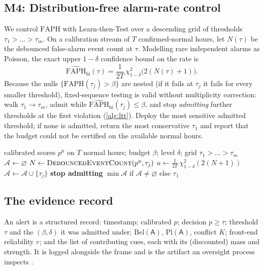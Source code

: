 \documentclass[conference]{IEEEtran}
\newcommand{\Rel}{r}                 %
\newcommand{\bel}{\mathrm{Bel}}
\newcommand{\pl}{\mathrm{Pl}}
\newcommand{\Anom}{\textsf{A}}       %
\newcommand{\faph}{\mathrm{FAPH}}
\begin{document}
\subsection{M4: Distribution-free alarm-rate control}
\label{sec:m4}
We control $\faph$ with Learn-then-Test \cite{angelopoulos2021ltt} over a
descending grid of thresholds $\tau_1>\dots>\tau_m$. On a calibration stream
of $T$ confirmed-normal hours, let $N(\tau)$ be the debounced false-alarm
event count at $\tau$. Modelling rare independent alarms as Poisson, the exact
upper $1-\delta$ confidence bound on the rate is
\begin{equation}
\widehat{\faph}_{\text{hi}}(\tau)=\frac{1}{2T}\,\chi^2_{1-\delta}\!\bigl(2(N(\tau)+1)\bigr).
\end{equation}
Because the nulls $\{\faph(\tau_j)>\beta\}$ are nested (if it fails at $\tau_j$
it fails for every smaller threshold), fixed-sequence testing is valid without
multiplicity correction: walk $\tau_1\!\to\!\tau_m$, admit while
$\widehat{\faph}_{\text{hi}}(\tau_j)\le\beta$, and stop \emph{admitting}
further thresholds at the first violation (\cref{alg:ltt}). Deploy the most sensitive admitted threshold; if none is
admitted, return the most conservative $\tau_1$ and report that the budget
could not be certified on the available normal hours.

\begin{algorithm}[t]
\caption{M4 --- alarm-rate control (Learn-then-Test)}
\label{alg:ltt}
\begin{algorithmic}[1]
\Require calibrated scores $p^{\text{n}}$ on $T$ normal hours; budget $\beta$;
level $\delta$; grid $\tau_1>\dots>\tau_m$
\State $\mathcal{A}\gets\varnothing$
  \State $N\gets\textsc{DebouncedEventCount}(p^{\text{n}},\tau_j)$
  \State $u\gets \tfrac{1}{2T}\,\chi^2_{1-\delta}(2(N{+}1))$
    \State $\mathcal{A}\gets\mathcal{A}\cup\{\tau_j\}$
  \Else
    \State \textbf{stop admitting} 
  \EndIf
\EndFor
\State \Return $\min\mathcal{A}$ if $\mathcal{A}\neq\varnothing$ else $\tau_1$
\end{algorithmic}
\end{algorithm}

\subsection{The evidence record}
\label{sec:record}
An alert is a structured record: timestamp; calibrated $p$; decision
$p\!\ge\!\tau$; threshold $\tau$ and the $(\beta,\delta)$ it was admitted
under; $\bel(\Anom)$, $\pl(\Anom)$, conflict $K$; front-end reliability
$\Rel$; and the list of contributing cues, each with its (discounted) mass and
strength. It is logged alongside the frame and is the artifact an oversight
process inspects \cite{euaiact2024}.
\end{document}
